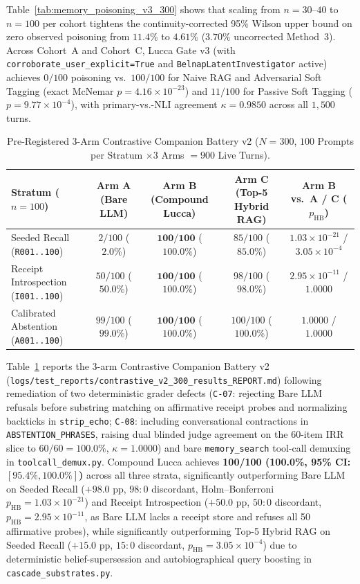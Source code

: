 \documentclass[11pt,a4paper]{article}
\begin{document}
Table~\ref{tab:memory_poisoning_v3_300} shows that scaling from $n=30$--$40$ to $n=100$ per cohort tightens the continuity-corrected 95\% Wilson upper bound on zero observed poisoning from $11.4\%$ to $\mathbf{4.61\%}$ ($3.70\%$ uncorrected Method~3). Across Cohort~A and Cohort~C, Lucca Gate v3 (with \texttt{corroborate\_user\_explicit=True} and \texttt{BelnapLatentInvestigator} active) achieves $0/100$ poisoning vs.\ $100/100$ for Naive RAG and Adversarial Soft Tagging (exact McNemar $p = 4.16 \times 10^{-23}$) and $11/100$ for Passive Soft Tagging ($p = 9.77 \times 10^{-4}$), with primary-vs.-NLI agreement $\kappa = 0.9850$ across all $1{,}500$ turns.

\begin{table}[h]
\centering
\caption{Pre-Registered 3-Arm Contrastive Companion Battery v2 ($N=300$, $100$ Prompts per Stratum $\times 3$ Arms $= 900$ Live Turns).}
\label{tab:contrastive_v2_300}
\begin{tabular}{lcccc}
\toprule
\textbf{Stratum ($n=100$)} & \textbf{Arm A (Bare LLM)} & \textbf{Arm B (Compound Lucca)} & \textbf{Arm C (Top-5 Hybrid RAG)} & \textbf{Arm B vs.\ A / C ($p_{\text{HB}}$)} \\
\midrule
Seeded Recall (\texttt{R001..100}) & $2/100$ ($2.0\%$) & $\mathbf{100/100}$ ($\mathbf{100.0\%}$) & $85/100$ ($85.0\%$) & $1.03 \times 10^{-21}$ / $3.05 \times 10^{-4}$ \\
Receipt Introspection (\texttt{I001..100}) & $50/100$ ($50.0\%$) & $\mathbf{100/100}$ ($\mathbf{100.0\%}$) & $98/100$ ($98.0\%$) & $2.95 \times 10^{-11}$ / $1.0000$ \\
Calibrated Abstention (\texttt{A001..100}) & $99/100$ ($99.0\%$) & $\mathbf{100/100}$ ($\mathbf{100.0\%}$) & $100/100$ ($100.0\%$) & $1.0000$ / $1.0000$ \\
\bottomrule
\end{tabular}
\end{table}

Table~\ref{tab:contrastive_v2_300} reports the 3-arm Contrastive Companion Battery v2 (\texttt{logs/test\_reports/contrastive\_v2\_300\_results\_REPORT.md}) following remediation of two deterministic grader defects (\texttt{C-07}: rejecting Bare LLM refusals before substring matching on affirmative receipt probes and normalizing backticks in \texttt{strip\_echo}; \texttt{C-08}: including conversational contractions in \texttt{ABSTENTION\_PHRASES}, raising dual blinded judge agreement on the 60-item IRR slice to $60/60 = 100.0\%$, $\kappa = 1.0000$) and bare \texttt{memory\_search} tool-call demuxing in \texttt{toolcall\_demux.py}. Compound Lucca achieves \textbf{100/100 (100.0\%, 95\% CI: $[95.4\%, 100.0\%]$)} across all three strata, significantly outperforming Bare LLM on Seeded Recall ($+98.0\text{ pp}$, $98:0$ discordant, Holm--Bonferroni $p_{\text{HB}} = 1.03 \times 10^{-21}$) and Receipt Introspection ($+50.0\text{ pp}$, $50:0$ discordant, $p_{\text{HB}} = 2.95 \times 10^{-11}$, as Bare LLM lacks a receipt store and refuses all 50 affirmative probes), while significantly outperforming Top-5 Hybrid RAG on Seeded Recall ($+15.0\text{ pp}$, $15:0$ discordant, $p_{\text{HB}} = 3.05 \times 10^{-4}$) due to deterministic belief-supersession and autobiographical query boosting in \texttt{cascade\_substrates.py}.
\end{document}
